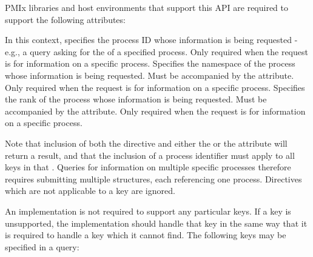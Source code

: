 \reqattrstart
\ac{PMIx} libraries and host environments that support this \ac{API} are required to support the following attributes:

In this context, specifies the process ID whose information is being requested - e.g., a query asking for the  of a specified process. Only required when the request is for information on a specific process.
\pasteAttributeItemEnd
{}Specifies the namespace of the process whose information is being requested. Must be accompanied by the  attribute. Only required when the request is for information on a specific process.
\pasteAttributeItemEnd
{}Specifies the rank of the process whose information is being requested. Must be accompanied by the  attribute. Only required when the request is for information on a specific process.
\pasteAttributeItemEnd
{}

Note that inclusion of both the  directive and either the  or the  attribute will return a  result, and that the inclusion of a process identifier must apply to all keys in that . Queries for information on multiple specific processes therefore requires submitting multiple  structures, each referencing one process.  Directives which are not applicable to a key are ignored.

\reqattrend

An implementation is not required to support any particular keys.  If a key is unsupported, the implementation should handle that key in the same way that it is required to handle a key which it cannot find.
The following keys may be specified in a query:

